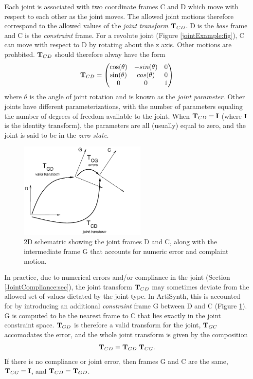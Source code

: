 Each joint is associated with two coordinate frames C and D which move
with respect to each other as the joint moves. The allowed joint
motions therefore correspond to the allowed values of the {\it joint transform}
${\bf T}_{CD}$.  D is the {\it base} frame and C is the {\it constraint}
frame. For a revolute joint (Figure \ref{jointExample:fig}), C can
move with respect to D by rotating about the z axis. Other motions are
prohbited. ${\bf T}_{CD}$ should therefore alway have the form
%
\begin{equation}
{\bf T}_{CD} = \left(\begin{matrix}
\cos(\theta) & -sin(\theta) & 0 \\
\sin(\theta) &  cos(\theta) & 0 \\
0 & 0 & 1\\
\end{matrix}\right)
\end{equation}
%
where $\theta$ is the angle of joint rotation and is known as the {\it
joint parameter}. Other joints have different parameterizations, with
the number of parameters equaling the number of degrees of freedom
available to the joint. When ${\bf T}_{CD} = {\bf I}$ (where ${\bf I}$ is the
identity transform), the parameters are all (usually) equal to zero,
and the joint is said to be in the {\it zero state}.

\begin{figure}[h]
\begin{center}
 \includegraphics[width=2.5in]{images/jointFrames}
\end{center}
\caption{2D schematric showing the joint frames D and C, along with
the intermediate frame G that accounts for numeric error
and complaint motion.}
\label{jointFrames:fig}
\end{figure}

In practice, due to numerical errors and/or compliance in the joint
(Section \ref{JointCompliance:sec}), the joint transform ${\bf T}_{CD}$ may
sometimes deviate from the allowed set of values dictated by the joint
type. In ArtiSynth, this is accounted for by introducing an additional
{\it constraint} frame G between D and C (Figure \ref{jointFrames:fig}).
G is computed to be the nearest frame to C that lies exactly 
in the joint constraint space. ${\bf T}_{GD}$ is therefore a
valid transform for the joint, ${\bf T}_{GC}$ accomodates the error,
and the whole joint transform is given by the composition
%
\begin{equation}
{\bf T}_{CD} = {\bf T}_{GD} \; {\bf T}_{CG}.
\end{equation}
%
If there is no compliance or joint error, then frames G and C are the
same, ${\bf T}_{CG} = {\bf I}$, and ${\bf T}_{CD} = {\bf T}_{GD}$.

